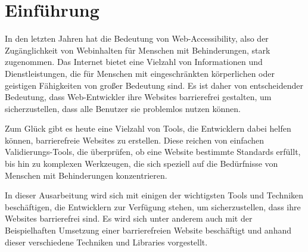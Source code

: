 \chapter{Einführung} 
\label{Introduction}

In den letzten Jahren hat die Bedeutung von Web-Accessibility, also der Zugänglichkeit von Webinhalten für Menschen mit Behinderungen, stark zugenommen. Das Internet bietet eine Vielzahl von Informationen und Dienstleistungen, die für Menschen mit eingeschränkten körperlichen oder geistigen Fähigkeiten von großer Bedeutung sind. Es ist daher von entscheidender Bedeutung, dass Web-Entwickler ihre Websites barrierefrei gestalten, um sicherzustellen, dass alle Benutzer sie problemlos nutzen können.

Zum Glück gibt es heute eine Vielzahl von Tools, die Entwicklern dabei helfen können, barrierefreie Websites zu erstellen. Diese reichen von einfachen Validierungs-Tools, die überprüfen, ob eine Website bestimmte Standards erfüllt, bis hin zu komplexen Werkzeugen, die sich speziell auf die Bedürfnisse von Menschen mit Behinderungen konzentrieren.

In dieser Ausarbeitung wird sich mit einigen der wichtigsten Tools und Techniken beschäftigen, die Entwicklern zur Verfügung stehen, um sicherzustellen, dass ihre Websites barrierefrei sind. Es wird sich unter anderem auch mit der Beispielhaften Umsetzung einer barrierefreien Website beschäftigt und anhand dieser verschiedene Techniken und Libraries vorgestellt.